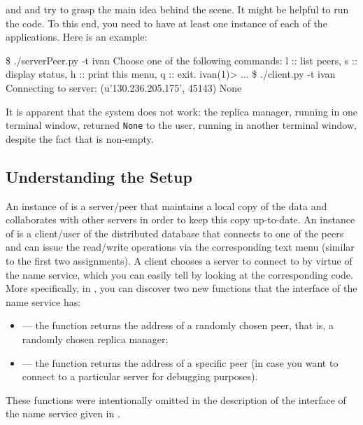 \documentclass[a4paper]{article}
\begin{document}
 and  and try to grasp the main idea
behind the scene. It might be helpful to run the code. To this end, you need to
have at least one instance of each of the applications. Here is an example:
\begin{shell}
\$ ./serverPeer.py -t ivan
Choose one of the following commands:
    l  ::  list peers,
    s  ::  display status,
    h  ::  print this menu,
    q  ::  exit.
ivan(1)>
...
\$ ./client.py -t ivan
Connecting to server: (u'130.236.205.175', 45143)
None
\end{shell}
It is apparent that the system does not work: the replica manager, running in
one terminal window, returned \texttt{None} to the user, running in another
terminal window, despite the fact that  is non-empty.

\subsection{Understanding the Setup}
An instance of  is a server/peer that maintains a local
copy of the data and collaborates with other servers in order to keep this copy
up-to-date. An instance of  is a client/user of the
distributed database that connects to one of the peers and can issue the
read/write operations via the corresponding text menu (similar to the first two
assignments). A client chooses a server to connect to by virtue of the name
service, which you can easily tell by looking at the corresponding code. More
specifically, in , you can discover two new functions that
the interface of the name service has:
\begin{itemize}

  \item {} --- the function returns the address of a randomly
  chosen peer, that is, a randomly chosen replica manager;

  \item {} --- the function returns the address of a
  specific peer (in case you want to connect to a particular server for
  debugging purposes).

\end{itemize}
These functions were intentionally omitted in the description of the interface
of the name service given in .
\end{document}
